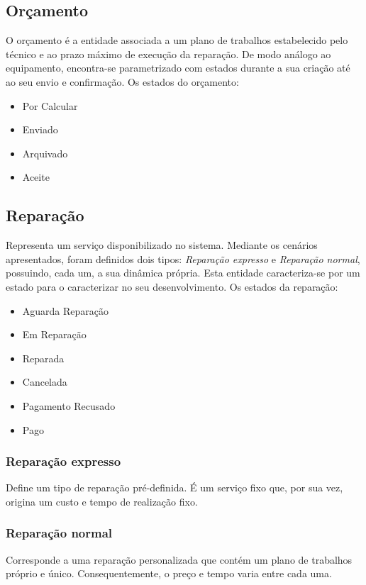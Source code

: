 \documentclass[a4paper,12pt]{scrreprt}
\begin{document}
\subsection{Orçamento} \label{ent_orcamento}
O orçamento é a entidade associada a um plano de trabalhos estabelecido pelo técnico e ao prazo máximo de execução da reparação.
De modo análogo ao equipamento, encontra-se parametrizado com estados durante a sua criação até ao seu envio e confirmação.
Os estados do orçamento:
\begin{itemize}
    \item Por Calcular
    \item Enviado
    \item Arquivado
    \item Aceite
\end{itemize}

\subsection{Reparação} \label{ent_reparacao}
Representa um serviço disponibilizado no sistema. 
Mediante os cenários apresentados, foram definidos dois tipos: \textit{Reparação expresso} e \textit{Reparação normal},
possuindo, cada um, a sua dinâmica própria.
Esta entidade caracteriza-se por um estado para o caracterizar no seu desenvolvimento.
Os estados da reparação:
\begin{itemize}
    \item Aguarda Reparação
    \item Em Reparação
    \item Reparada
    \item Cancelada
    \item Pagamento Recusado
    \item Pago
\end{itemize}

\subsubsection{Reparação expresso} \label{ent_reparacao-expresso}
Define um tipo de reparação pré-definida.
É um serviço fixo que, por sua vez, origina um custo e tempo de realização fixo.

\subsubsection{Reparação normal} \label{ent_reparacao-normal}
Corresponde a uma reparação personalizada que contém um plano de trabalhos próprio e único.
Consequentemente, o preço e tempo varia entre cada uma.
\end{document}
